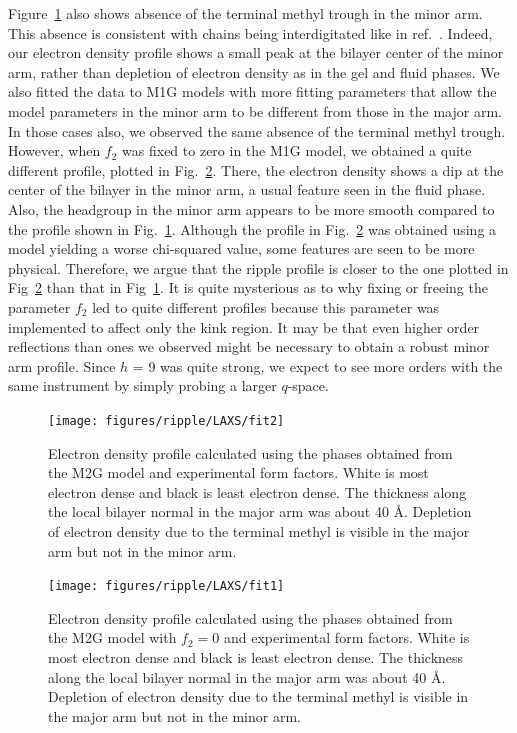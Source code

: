 Figure~\ref{fig:fit2} also shows absence of the terminal methyl trough
in the minor arm. This absence is consistent with chains being interdigitated
like in ref.~\cite{ref:deVries05}. Indeed, our electron density profile
shows a small peak at the bilayer center of the minor arm, rather than
depletion of electron density as in the gel and fluid phases. We also fitted
the data to M1G models with more fitting parameters that allow the model 
parameters in the minor arm to be different from those in the major arm.
In those cases also, we observed the same absence of the terminal methyl trough.
However, when $f_2$ was fixed to zero in the M1G model, we obtained a quite
different profile, plotted in Fig.~\ref{fig:fit1}. There, the electron density 
shows a dip at the center of the bilayer in the minor arm, a usual feature
seen in the fluid phase. Also, the headgroup in the minor arm appears
to be more smooth compared to the profile shown in Fig.~\ref{fig:fit2}.
Although the profile in Fig.~\ref{fig:fit1} was obtained using a model yielding
a worse chi-squared value, some features are seen to be more physical.
Therefore, we argue that the ripple profile is closer to the one plotted in 
Fig~\ref{fig:fit1} than that in Fig~\ref{fig:fit2}. It is quite mysterious
as to why fixing or freeing the parameter $f_2$ led to quite different profiles 
because this parameter was implemented to affect only the kink region. It 
may be that even higher order reflections than ones we observed might be 
necessary to obtain a robust minor arm profile. Since $h$ = 9 was quite strong,
we expect to see more orders with the same instrument by simply probing a
larger $q$-space.

\newpage
\begin{figure}[htbp]
  \centering
  \texttt{[image: figures/ripple/LAXS/fit2]}
  \caption[Electron density profile calculated using the phases obtained from the M2G
  model and experimental form factors]
  {Electron density profile calculated using the phases obtained from the M2G
  model and experimental form factors. White is most electron dense and
  black is least electron dense. The thickness along the local bilayer normal
  in the major arm was about 40 \AA. Depletion of electron density due to
  the terminal methyl is visible in the major arm but not in the minor arm.}
  \label{fig:fit2}
\end{figure}

\begin{figure}[htbp]
  \centering
  \texttt{[image: figures/ripple/LAXS/fit1]}
  \caption[Electron density profile calculated using the phases obtained from the M2G
  model and experimental form factors]
  {Electron density profile calculated using the phases obtained from the M2G
  model with $f_2=0$ and experimental form factors. White is most electron dense and
  black is least electron dense. The thickness along the local bilayer normal
  in the major arm was about 40 \AA. Depletion of electron density due to
  the terminal methyl is visible in the major arm but not in the minor arm.}
  \label{fig:fit1}
\end{figure}


